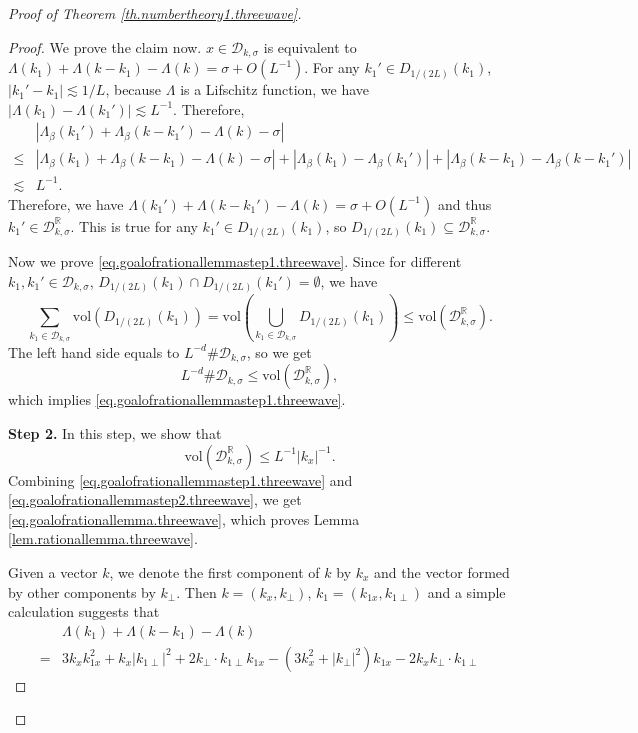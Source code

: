 \begin{proof}[Proof of Theorem \ref{th.numbertheory1.threewave}]
\begin{proof}
We prove the claim now. $x\in \mathcal{D}_{k,\sigma}$ is equivalent to $\Lambda(k_1)+\Lambda(k-k_1)-\Lambda(k)=\sigma+O(L^{-1})$. For any $k_1'\in D_{1/(2L)}(k_1)$, $|k_1'-k_1|\lesssim 1/L$, because $\Lambda$ is a Lifschitz function, we have $|\Lambda(k_1)-\Lambda(k_1')|\lesssim L^{-1}$. Therefore, 
\begin{equation}
\begin{split}
    &|\Lambda_{\beta}(k_1')+\Lambda_{\beta}(k-k_1')-\Lambda(k)-\sigma|
    \\
    \le &|\Lambda_{\beta}(k_1)+\Lambda_{\beta}(k-k_1)-\Lambda(k)-\sigma|+|\Lambda_{\beta}(k_1)-\Lambda_{\beta}(k_1')|+|\Lambda_{\beta}(k-k_1)-\Lambda_{\beta}(k-k_1')|
    \\
    \lesssim & L^{-1}.
\end{split}
\end{equation}
Therefore, we have $\Lambda(k_1')+\Lambda(k-k_1')-\Lambda(k)=\sigma+O(L^{-1})$ and thus $k_1'\in \mathcal{D}^{\mathbb{R}}_{k,\sigma}$. This is true for any $k_1'\in D_{1/(2L)}(k_1)$, so $D_{1/(2L)}(k_1)\subseteq \mathcal{D}^{\mathbb{R}}_{k,\sigma}$.

Now we prove \eqref{eq.goalofrationallemmastep1.threewave}. Since for different $k_1,k_1'\in \mathcal{D}_{k,\sigma}$, $D_{1/(2L)}(k_1)\cap D_{1/(2L)}(k_1')=\emptyset$, we have 
\begin{equation}
    \sum_{k_1\in \mathcal{D}_{k,\sigma}} \text{vol}( D_{1/(2L)}(k_1))=\text{vol}\left( \bigcup_{k_1\in \mathcal{D}_{k,\sigma}} D_{1/(2L)}(k_1)\right)\le \text{vol}(\mathcal{D}^{\mathbb{R}}_{k,\sigma}).
\end{equation}
The left hand side equals to $L^{-d}\#\mathcal{D}_{k,\sigma}$, so we get
\begin{equation}
    L^{-d}\#\mathcal{D}_{k,\sigma}\le \text{vol}(\mathcal{D}^{\mathbb{R}}_{k,\sigma}),
\end{equation}
which implies \eqref{eq.goalofrationallemmastep1.threewave}.

\textbf{Step 2.} In this step, we show that 
\begin{equation}\label{eq.goalofrationallemmastep2.threewave}
    \text{vol}(\mathcal{D}^{\mathbb{R}}_{k,\sigma})\le L^{-1} |k_x|^{-1}.
\end{equation}
Combining \eqref{eq.goalofrationallemmastep1.threewave} and \eqref{eq.goalofrationallemmastep2.threewave}, we get
\eqref{eq.goalofrationallemma.threewave}, which proves Lemma \ref{lem.rationallemma.threewave}.

Given a vector $k$, we denote the first component of $k$ by $k_x$ and the vector formed by other components by $k_{\perp}$. Then $k=(k_x, k_{\perp})$, $k_1=(k_{1x}, k_{1\perp})$ and a simple calculation suggests that
\begin{equation}\label{eq.A11.threewave}
\begin{split}
    &\Lambda(k_1)+\Lambda(k-k_1)-\Lambda(k)
 \\
 =&3k_xk_{1x}^2+k_x|k_{1\perp}|^2+2k_{\perp}\cdot k_{1\perp}k_{1x}-(3k_x^2+|k_{\perp}|^2)k_{1x}-2k_x k_{\perp}\cdot k_{1\perp}
\end{split}
\end{equation}


\end{proof}
\end{proof}
